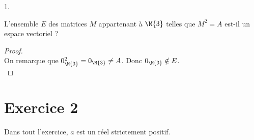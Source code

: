 \documentclass[11pt]{article}%
\begin{document}
\begin{noliste}{1.}
\item L'ensemble $E$ des matrices $M$ appartenant à $\M{3}$ telles que
  $M^2=A$ est-il un espace vectoriel ?

  \begin{proof}~\\
    On remarque que $0_{\M{3}}^2=0_{\M{3}}\neq A$. Donc $0_{\M{3}}
    \notin E$.%
    ~\\[-1.4cm]
\end{proof}
\end{noliste}








\section*{Exercice 2}
\noindent
Dans tout l'exercice, $a$ est un réel strictement positif.
\end{document}
